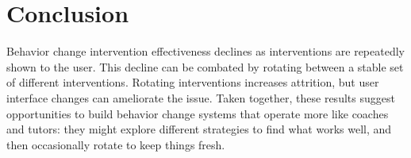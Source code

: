 \section{Conclusion}

Behavior change intervention effectiveness declines as interventions are repeatedly shown to the user. This decline can be combated by rotating between a stable set of different interventions. Rotating interventions increases attrition, but user interface changes can ameliorate the issue. Taken together, these results suggest opportunities to build behavior change systems that operate more like coaches and tutors: they might explore different strategies to find what works well, and then occasionally rotate to keep things fresh. %





